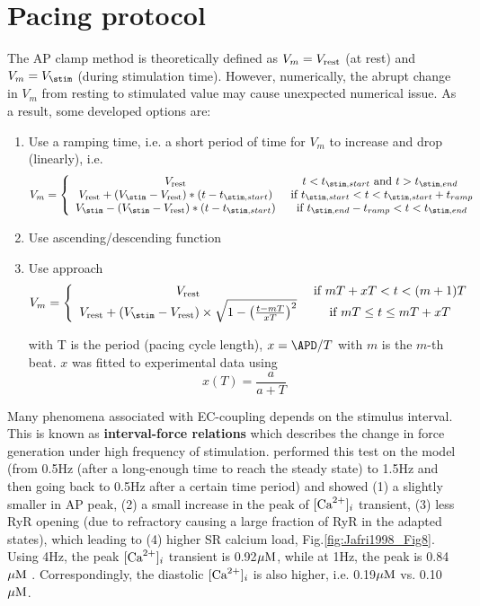 \section{Pacing protocol}
\label{sec:pacing_protocol}

The AP clamp method is theoretically defined as $V_m=V_{\text{rest}}$ (at rest) and
$V_m=V_\stim$ (during stimulation time).  However, numerically, the abrupt
change in $V_m$ from resting to stimulated value may cause unexpected numerical
issue. As a result, some developed options are:
\begin{enumerate}
  \item Use a ramping time, i.e. a short period of time for $V_m$ to increase
  and drop (linearly), i.e. 
  \begin{equation}
  V_m = \left\{ \begin{array}{cc}
  	V_\rest  & t < t_{\stim, start} \text{ and }	 t > t_{\stim, end} \\
  	V_\rest + (V_\stim-V_\rest) * (t-t_{\stim,start}) & \text{ if } t_{\stim,
  	start} < t < t_{\stim, start} + t_{ramp} \\
  	V_\stim - (V_\stim-V_\rest) * (t-t_{\stim,start}) & \text{ if } t_{\stim,
  	end} - t_{ramp} < t < t_{\stim, end}  
  \end{array}\right.
  \end{equation}
  \item Use ascending/descending function
  
  \item Use \citep{chudin1999icd} approach
  \begin{equation}
  V_m = \left\{ \begin{array}{cc}
  V_\rest & \text{ if }	mT + xT < t < (m+1)T \\
  V_\rest + (V_\stim - V_\rest) \times \sqrt{1 - \left( \frac{t-mT}{xT}
  \right)^2} & \text{ if }	mT \le t \le mT + xT
  \end{array} \right.
  \end{equation}
  
  with T is the period (pacing cycle length), $x=\APD/T$ with $m$ is the $m$-th
  beat. $x$ was fitted to experimental data using 
  \begin{equation}
  x(T) = \frac{a}{a+T}
  \end{equation}
\end{enumerate}

Many phenomena associated with EC-coupling depends on the stimulus interval.
This is known as {\bf interval-force relations} which describes the change in
force generation under high frequency of stimulation. \citep{jafri1998cad}
performed this test on the model (from 0.5Hz (after a long-enough time to
reach the steady state) to 1.5Hz and then going back to 0.5Hz after a certain
time period) and showed (1) a slightly smaller in AP peak, (2) a small increase
in the peak of $[{\text{Ca}^{2+}}]_i$ transient, (3) less RyR opening (due to refractory
causing a large fraction of RyR in the adapted states), which leading to (4)
higher SR calcium load, Fig.\ref{fig:Jafri1998_Fig8}.
Using 4Hz, the peak $[{\text{Ca}^{2+}}]_i$ transient is 0.92${\mu\text{M}}$, while at 1Hz, the peak is
0.84${\mu\text{M}}$ \citep{jafri1998cad}. Correspondingly, the diastolic $[{\text{Ca}^{2+}}]_i$ is
also higher, i.e. 0.19${\mu\text{M}}$ vs. 0.10${\mu\text{M}}$.

